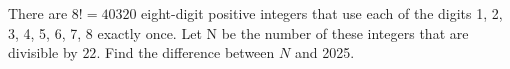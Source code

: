 There are $8!= 40320$ eight-digit positive integers that use each of the digits 1, 2, 3, 4, 5, 6, 7, 8 exactly once. Let N be the number of these integers that are divisible by $22$. Find the difference between $N$ and 2025.